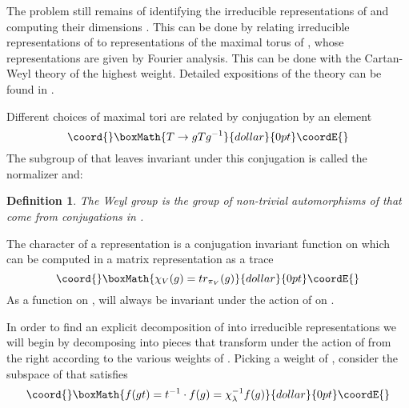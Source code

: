 \documentclass[a4paper,a4paper]{article}
\newtheorem{define}{Definition}
\theoremstyle{conjecture}
\begin{document}
The problem still remains of identifying the irreducible
representations of \coordHE{} and computing their dimensions \coordHE{}. This
can be done by relating irreducible representations of \coordHE{} to
representations of the maximal torus \coordHE{} of \coordHE{}, whose
representations are given by Fourier analysis.  This can be done
with the Cartan-Weyl theory of the highest weight. Detailed
expositions of the theory can be found in \cite{Adams,Br-tD}.

Different choices of maximal tori \coordHE{} are related by conjugation by an element \coordHE{}  $$\coord{}\boxMath{T\rightarrow gTg^{-1}}{dollar}{0pt}\coordE{}$$
The subgroup of \coordHE{} that leaves \coordHE{} invariant under this conjugation is called the
normalizer \coordHE{} and:
\begin{define}
The Weyl group \coordHE{} is the group \coordHE{} of non-trivial automorphisms of \coordHE{} that
come from conjugations in \coordHE{}.
\end{define}

The character \coordHE{} of a representation is a conjugation
invariant function on \coordHE{} which can be computed in a matrix
representation \coordHE{} as a trace
$$\coord{}\boxMath{\chi_V(g) = tr_{\pi_V}(g)}{dollar}{0pt}\coordE{}$$
As a function on \coordHE{}, \coordHE{} will always be invariant under the action of \coordHE{} on \coordHE{}.

In order to find an explicit decomposition of \coordHE{} into irreducible representations
we will begin by decomposing
\coordHE{} into pieces that transform under the action of \coordHE{} from the right according to the various
weights of \coordHE{}. Picking a weight \myHighlight{$\lambda$}\coordHE{} of \coordHE{}, consider the subspace of
\coordHE{} that satisfies
$$\coord{}\boxMath{f(gt)=t^{-1}\cdot f(g)=\chi_\lambda^{-1}f(g)}{dollar}{0pt}\coordE{}$$
\end{document}
